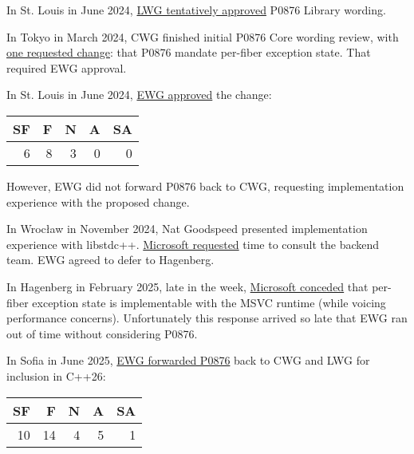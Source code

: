 \label{wg21_history}

In St. Louis in June 2024,
\href{https://docs.google.com/document/d/1ebdFai3h2Y4g5NayNf_pG6Gl2qidYdF6G-smMWNw-Go/edit?tab=t.0#heading=h.9aqgmrf0hvh1}{LWG tentatively approved}
P0876 Library wording.

In Tokyo in March 2024, CWG finished initial P0876 Core wording review, with
\href{https://wiki.edg.com/bin/view/Wg21tokyo2024/CoreWorkingGroup#D0876R16_fiber_context}{one requested change}:
that P0876 mandate per-fiber exception state. That required EWG approval.

In St. Louis in June 2024,
\href{https://wiki.edg.com/bin/view/Wg21stlouis2024/NotesEWGP0876}{EWG approved} the change:

\begin{table}[ht]
\begin{tabular}{|r|r|r|r|r|} %
\hline %
SF & F & N & A & SA \\ [0.5ex] %
\hline %
6 & 8 & 3 & 0 & 0 \\ %
\hline %
\end{tabular}
\end{table}

However, EWG did not forward P0876 back to CWG, requesting implementation
experience with the proposed change.

In Wrocław in November 2024, Nat Goodspeed presented implementation experience
with libstdc++.
\href{https://wiki.edg.com/bin/view/Wg21wroclaw2024/NotesEWGP0876}{Microsoft requested}
time to consult the backend team. EWG agreed to defer to Hagenberg.

In Hagenberg in February 2025, late in the week,
\href{https://lists.isocpp.org/ext/2025/02/25138.php}{Microsoft conceded} that
per-fiber exception state is implementable with the MSVC runtime (while voicing
performance concerns). Unfortunately this response arrived so late that EWG
ran out of time without considering P0876.

In Sofia in June 2025,
\href{https://docs.google.com/document/d/1wItX212LurEjkJK53XxnxumciqTRzxTSTJ48GwFihpE/edit?tab=t.0#heading=h.zc6lxwkrnobj}{EWG forwarded P0876}
back to CWG and LWG for inclusion in C++26:

\begin{table}[ht]
\begin{tabular}{|r|r|r|r|r|} %
\hline %
SF & F & N & A & SA \\ [0.5ex] %
\hline %
10 & 14 & 4 & 5 & 1 \\ %
\hline %
\end{tabular}
\end{table}

